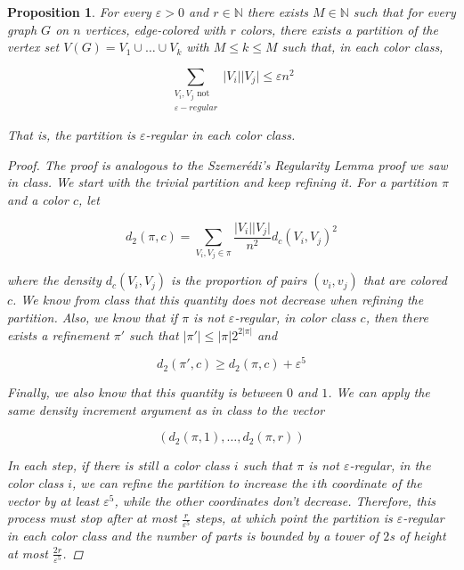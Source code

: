 \documentclass{amsart}
\theoremstyle{plain}
\newtheorem*{proposition}{\textbf{Proposition}}
\theoremstyle{definition}
\newcommand{\N}{\mathbb{N}}
\begin{document}
    \begin{proposition}
        For every $\varepsilon > 0$ and $r \in \N$ there exists $M \in \N$ such that
        for every graph $G$ on $n$ vertices, edge-colored with $r$ colors, there exists a partition of the vertex set
        $V(G) = V_1 \cup \ldots \cup V_k$ with $M \leq k \leq M$ such that, in each color class,

        \[
             \sum_{\substack{V_i, V_j \text{ not } \\ \varepsilon-regular}} \lvert V_i \rvert \lvert V_j \rvert \leq \varepsilon n^2
        \]

        That is, the partition is $\varepsilon$-regular in each color class.

        \begin{proof}
            The proof is analogous to the Szemerédi's Regularity Lemma proof we saw in class.
            We start with the trivial partition and keep refining it.
            For a partition $\pi$ and a color $c$, let

            \[
                d_2(\pi, c) = \sum_{V_i, V_j \in \pi} \frac{\lvert V_i \rvert \lvert V_j \rvert}{n^2} d_c(V_i, V_j)^2
            \]

            where the density $d_c(V_i, V_j)$ is the proportion of pairs $(v_i, v_j)$ that are colored $c$.
            We know from class that this quantity does not decrease when refining the partition.
            Also, we know that if $\pi$ is not $\varepsilon$-regular, in color class $c$, then there exists
            a refinement $\pi'$ such that $\lvert \pi' \rvert \leq \lvert \pi \rvert 2^{2 \lvert \pi \rvert}$ and

            \[
                d_2(\pi', c) \geq d_2(\pi, c) + \varepsilon^5
            \]

            Finally, we also know that this quantity is between $0$ and $1$.
            We can apply the same density increment argument as in class to the vector

            \[
                \left( d_2(\pi, 1), \ldots, d_2(\pi, r) \right)
            \]

            In each step, if there is still a color class $i$ such that $\pi$ is not $\varepsilon$-regular,
            in the color class $i$, we can refine the partition to increase the $i$th coordinate of the vector
            by at least $\varepsilon^5$, while the other coordinates don't decrease.
            Therefore, this process
            must stop after at most $\frac{r}{\varepsilon^5}$ steps,
            at which point the partition is $\varepsilon$-regular in each color class
            and the number of parts is bounded by a tower of $2$s of height at most $\frac{2r}{\varepsilon^5}$. \qedhere

        \end{proof}
    \end{proposition}
\end{document}
